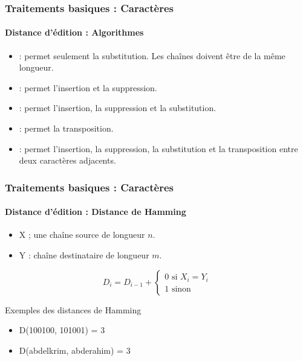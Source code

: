 \documentclass[xcolor=table]{beamer}
\begin{document}
\begin{frame}
\frametitle{Traitements basiques : Caractères}
\framesubtitle{Distance d'édition : Algorithmes}

\begin{itemize}
	\item {} : permet seulement la substitution. Les chaînes doivent être de la même longueur. 
	\item {} : permet l'insertion et la suppression.
	\item {} : permet l'insertion, la suppression et la substitution.
	\item {} : permet la transposition.
	\item {} : permet l'insertion, la suppression, la substitution et la transposition entre deux caractères adjacents.
\end{itemize}

\end{frame}


\begin{frame}
	\frametitle{Traitements basiques : Caractères}
	\framesubtitle{Distance d'édition : Distance de Hamming}
	
	\begin{itemize}
		\item X ; une chaîne source de longueur $n$.
		\item Y : chaîne destinataire de longueur $m$.
	\end{itemize}
	
	\[
	D_{i} = D_{i-1} + 
	\begin{cases}
	0 \text{ si } X_i = Y_i\\
	1 \text{ sinon}
	\end{cases}
	\]
	
	\begin{exampleblock}{Exemples des distances de Hamming}
		\begin{itemize}
			\item D(100100, 101001) = 3
			\item D(abdelkrim, abderahim) = 3
		\end{itemize}
	\end{exampleblock}
	
	
	
\end{frame}
\end{document}
